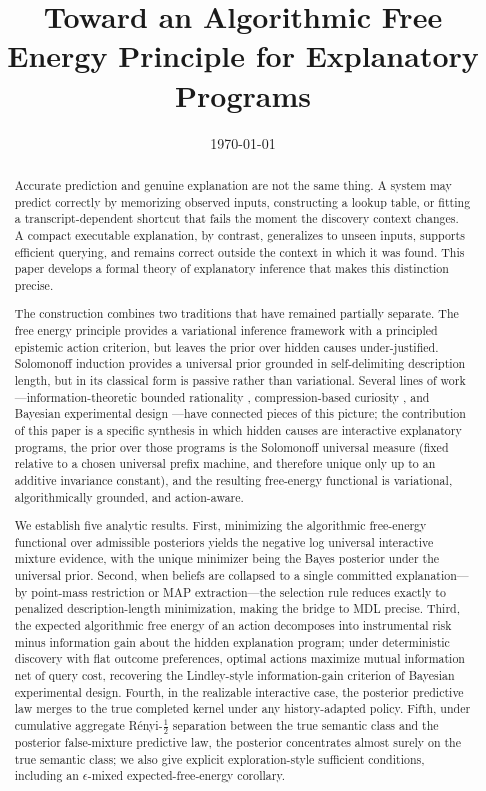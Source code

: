 \documentclass[11pt]{article}
\title{Toward an Algorithmic Free Energy Principle for Explanatory Programs}
\author{}
\date{\today}
\theoremstyle{remark}
\begin{document}
\maketitle

\begin{abstract}
Accurate prediction and genuine explanation are not the same thing. A system may predict correctly by memorizing observed inputs, constructing a lookup table, or fitting a transcript-dependent shortcut that fails the moment the discovery context changes. A compact executable explanation, by contrast, generalizes to unseen inputs, supports efficient querying, and remains correct outside the context in which it was found. This paper develops a formal theory of explanatory inference that makes this distinction precise.

The construction combines two traditions that have remained partially separate. The free energy principle provides a variational inference framework with a principled epistemic action criterion, but leaves the prior over hidden causes under-justified. Solomonoff induction provides a universal prior grounded in self-delimiting description length, but in its classical form is passive rather than variational. Several lines of work---information-theoretic bounded rationality \citep{OrtegaBraun2013}, compression-based curiosity \citep{Schmidhuber2010}, and Bayesian experimental design \citep{Lindley1956,ChalonerVerdinelli1995}---have connected pieces of this picture; the contribution of this paper is a specific synthesis in which hidden causes are interactive explanatory programs, the prior over those programs is the Solomonoff universal measure (fixed relative to a chosen universal prefix machine, and therefore unique only up to an additive invariance constant), and the resulting free-energy functional is variational, algorithmically grounded, and action-aware.

We establish five analytic results. First, minimizing the algorithmic free-energy functional over admissible posteriors yields the negative log universal interactive mixture evidence, with the unique minimizer being the Bayes posterior under the universal prior. Second, when beliefs are collapsed to a single committed explanation---by point-mass restriction or MAP extraction---the selection rule reduces exactly to penalized description-length minimization, making the bridge to MDL precise. Third, the expected algorithmic free energy of an action decomposes into instrumental risk minus information gain about the hidden explanation program; under deterministic discovery with flat outcome preferences, optimal actions maximize mutual information net of query cost, recovering the Lindley-style information-gain criterion of Bayesian experimental design. Fourth, in the realizable interactive case, the posterior predictive law merges to the true completed kernel under any history-adapted policy. Fifth, under cumulative aggregate R\'enyi-\(\frac12\) separation between the true semantic class and the posterior false-mixture predictive law, the posterior concentrates almost surely on the true semantic class; we also give explicit exploration-style sufficient conditions, including an \(\epsilon\)-mixed expected-free-energy corollary.


\end{abstract}
\end{document}

